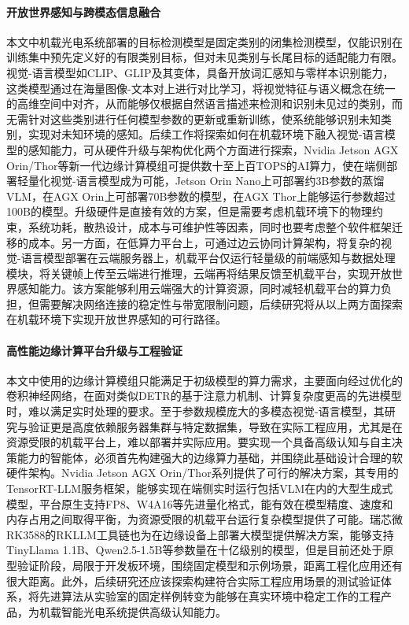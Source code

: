 \paragraph{开放世界感知与跨模态信息融合}
本文中机载光电系统部署的目标检测模型是固定类别的闭集检测模型，仅能识别在训练集中预先定义好的有限类别目标，但对未见类别与长尾目标的适配能力有限。视觉-语言模型如CLIP、GLIP及其变体，具备开放词汇感知与零样本识别能力，这类模型通过在海量图像-文本对上进行对比学习，将视觉特征与语义概念在统一的高维空间中对齐，从而能够仅根据自然语言描述来检测和识别未见过的类别，而无需针对这些类别进行任何模型参数的更新或重新训练，使系统能够识别未知类别，实现对未知环境的感知。后续工作将探索如何在机载环境下融入视觉-语言模型的感知能力，可从硬件升级与架构优化两个方面进行探索，Nvidia Jetson AGX Orin/Thor等新一代边缘计算模组可提供数十至上百TOPS的AI算力，使在端侧部署轻量化视觉-语言模型成为可能，Jetson Orin Nano上可部署约3B参数的蒸馏VLM，在AGX Orin上可部署70B参数的模型，在AGX Thor上能够运行参数超过100B的模型。升级硬件是直接有效的方案，但是需要考虑机载环境下的物理约束，系统功耗，散热设计，成本与可维护性等因素，同时也要考虑整个软件框架迁移的成本。另一方面，在低算力平台上，可通过边云协同计算架构，将复杂的视觉-语言模型部署在云端服务器上，机载平台仅运行轻量级的前端感知与数据处理模块，将关键帧上传至云端进行推理，云端再将结果反馈至机载平台，实现开放世界感知能力。该方案能够利用云端强大的计算资源，同时减轻机载平台的算力负担，但需要解决网络连接的稳定性与带宽限制问题，后续研究将从以上两方面探索在机载环境下实现开放世界感知的可行路径。

\paragraph{高性能边缘计算平台升级与工程验证}
本文中使用的边缘计算模组只能满足于初级模型的算力需求，主要面向经过优化的卷积神经网络，在面对类似DETR的基于注意力机制、计算复杂度更高的先进模型时，难以满足实时处理的要求。至于参数规模庞大的多模态视觉-语言模型，其研究与验证更是高度依赖服务器集群与特定数据集，导致在实际工程应用，尤其是在资源受限的机载平台上，难以部署并实际应用。要实现一个具备高级认知与自主决策能力的智能体，必须首先构建强大的边缘算力基础，并围绕此基础设计合理的软硬件架构。Nvidia Jetson AGX Orin/Thor系列提供了可行的解决方案，其专用的TensorRT-LLM服务框架，能够实现在端侧实时运行包括VLM在内的大型生成式模型，平台原生支持FP8、W4A16等先进量化格式，能有效在模型精度、速度和内存占用之间取得平衡，为资源受限的机载平台运行复杂模型提供了可能。瑞芯微RK3588的RKLLM工具链也为在边缘设备上部署大模型提供解决方案，能够支持TinyLlama 1.1B、Qwen2.5-1.5B等参数量在十亿级别的模型，但是目前还处于原型验证阶段，局限于开发板环境，围绕固定模型和示例场景，距离工程化应用还有很大距离。此外，后续研究还应该探索构建符合实际工程应用场景的测试验证体系，将先进算法从实验室的固定样例转变为能够在真实环境中稳定工作的工程产品，为机载智能光电系统提供高级认知能力。


